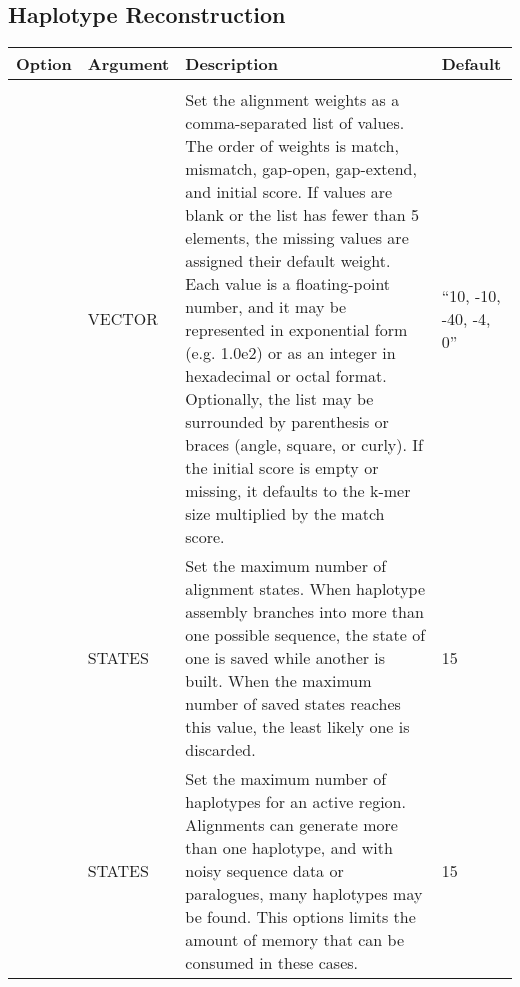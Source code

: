 

\subsection{Haplotype Reconstruction}
\label{sec.cmdline.opts.haplo}

\begin{small}
	\begin{longtable}{|p{\optwidth}|p{\argwidth}|p{\dscwidth}|p{}|}
		\hline
		
		\textbf{Option} & \textbf{Argument} & \textbf{Description} & \textbf{Default} \\ \hline
		
		\optbox{\sopt{w}\\\lopt{weight}} & VECTOR &
		Set the alignment weights as a comma-separated list of values. The order of weights is match, mismatch, gap-open, gap-extend, and initial score. If values are blank or the list has fewer than 5 elements, the missing values are assigned their default weight. Each value is a floating-point number, and it may be represented in exponential form (e.g. 1.0e2) or as an integer in hexadecimal or octal format. Optionally, the list may be surrounded by parenthesis or braces (angle, square, or curly). If the initial score is empty or missing, it defaults to the k-mer size multiplied by the match score.
		& ``10, -10, -40, -4, 0''
		\\ \hline
		
		\lopt{maxalignstates} & STATES &
		Set the maximum number of alignment states. When haplotype assembly branches into more than one possible sequence, the state of one is saved while another is built. When the maximum number of saved states reaches this value, the least likely one is discarded.
		& 15
		\\ \hline
		
		\lopt{maxhapstates} & STATES &
		Set the maximum number of haplotypes for an active region. Alignments can generate more than one haplotype, and with noisy sequence data or paralogues, many haplotypes may be found. This options limits the amount of memory that can be consumed in these cases.
		& 15
		\\ \hline


	\end{longtable}
\end{small}



